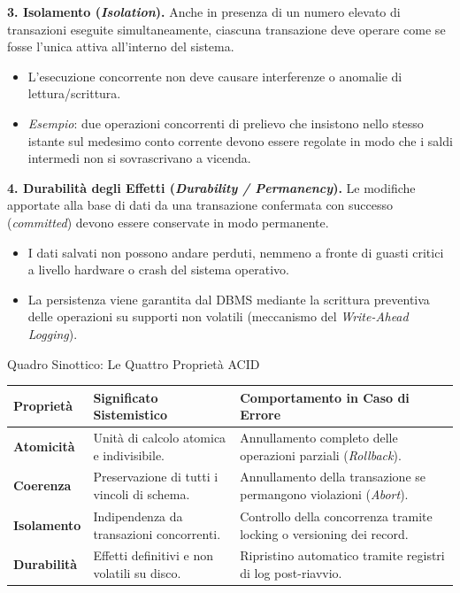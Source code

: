 \documentclass[12pt]{extarticle}
\begin{document}
\medskip
\noindent \textbf{3. Isolamento (\textit{Isolation}).} Anche in presenza di un numero elevato di transazioni eseguite simultaneamente, ciascuna transazione deve operare come se fosse l'unica attiva all'interno del sistema.
\begin{itemize}
    \item L'esecuzione concorrente non deve causare interferenze o anomalie di lettura/scrittura.
    \item \textit{Esempio}: due operazioni concorrenti di prelievo che insistono nello stesso istante sul medesimo conto corrente devono essere regolate in modo che i saldi intermedi non si sovrascrivano a vicenda.
\end{itemize}

\medskip
\noindent \textbf{4. Durabilità degli Effetti (\textit{Durability / Permanency}).} Le modifiche apportate alla base di dati da una transazione confermata con successo (\textit{committed}) devono essere conservate in modo permanente.
\begin{itemize}
    \item I dati salvati non possono andare perduti, nemmeno a fronte di guasti critici a livello hardware o crash del sistema operativo.
    \item La persistenza viene garantita dal DBMS mediante la scrittura preventiva delle operazioni su supporti non volatili (meccanismo del \textit{Write-Ahead Logging}).
\end{itemize}

\begin{cbox}{Quadro Sinottico: Le Quattro Proprietà ACID}
\begin{center}
\small
\begin{tabular}{p{2.6cm}p{6.4cm}p{6.4cm}}
    \toprule
    \textbf{Proprietà} & \textbf{Significato Sistemistico} & \textbf{Comportamento in Caso di Errore} \\
    \midrule
    \textbf{Atomicità} & Unità di calcolo atomica e indivisibile. & Annullamento completo delle operazioni parziali (\textit{Rollback}). \\
    \addlinespace
    \textbf{Coerenza} & Preservazione di tutti i vincoli di schema. & Annullamento della transazione se permangono violazioni (\textit{Abort}). \\
    \addlinespace
    \textbf{Isolamento} & Indipendenza da transazioni concorrenti. & Controllo della concorrenza tramite locking o versioning dei record. \\
    \addlinespace
    \textbf{Durabilità} & Effetti definitivi e non volatili su disco. & Ripristino automatico tramite registri di log post-riavvio. \\
    \bottomrule
\end{tabular}
\end{center}
\end{cbox}
\end{document}
